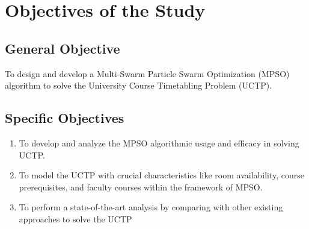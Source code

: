\section{Objectives of the Study}
\label{sec:objectives}

\subsection{General Objective}
\label{subsec:generalobjective}

To design and develop a Multi-Swarm Particle Swarm Optimization (MPSO) algorithm to solve the University Course Timetabling Problem (UCTP).

\subsection{Specific Objectives}
\label{subsec:specificobjectives}
\begin{enumerate}
    \item To develop and analyze the MPSO algorithmic usage and efficacy in solving UCTP. 
    \item To model the UCTP with crucial characteristics like room availability, course prerequisites, and faculty courses within the framework of MPSO. 
    \item To perform a state-of-the-art analysis by comparing with other existing approaches to solve the UCTP
\end{enumerate}
